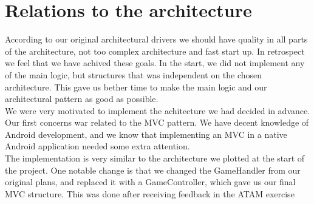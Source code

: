 \section{Relations to the architecture}

According to our original architectural drivers we should have quality in all parts of the architecture, not too complex architecture and fast start up. In retrospect we feel that we have achived these goals. In the start, we did not implement any of the main logic, but structures that was independent on the chosen architecture. This gave us bether time to make the main logic and our architectural pattern as good as possible.\\

We were very motivated to implement the achitecture we had decided in advance. Our first concerns war related to the MVC pattern. We have decent knowledge of Android development, and we know that implementing an MVC in a native Android application needed some extra attention. \\

The implementation is very similar to the architecture we plotted at the start of the project. One notable change is that we changed the GameHandler from our original plans, and replaced it with a GameController, which gave us our final MVC structure. This was done after receiving feedback in the ATAM exercise 

